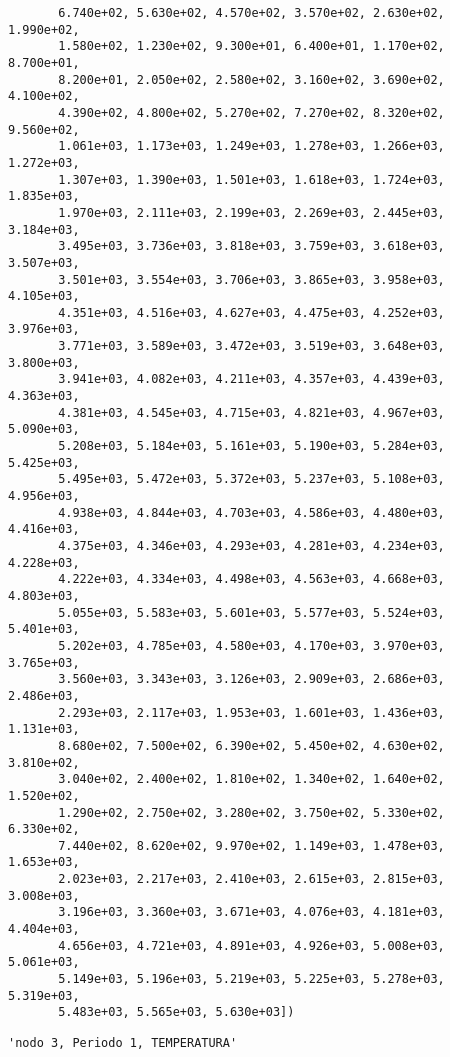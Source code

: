 \documentclass[11pt]{article}
\begin{document}
\begin{verbatim}
       6.740e+02, 5.630e+02, 4.570e+02, 3.570e+02, 2.630e+02, 1.990e+02,
       1.580e+02, 1.230e+02, 9.300e+01, 6.400e+01, 1.170e+02, 8.700e+01,
       8.200e+01, 2.050e+02, 2.580e+02, 3.160e+02, 3.690e+02, 4.100e+02,
       4.390e+02, 4.800e+02, 5.270e+02, 7.270e+02, 8.320e+02, 9.560e+02,
       1.061e+03, 1.173e+03, 1.249e+03, 1.278e+03, 1.266e+03, 1.272e+03,
       1.307e+03, 1.390e+03, 1.501e+03, 1.618e+03, 1.724e+03, 1.835e+03,
       1.970e+03, 2.111e+03, 2.199e+03, 2.269e+03, 2.445e+03, 3.184e+03,
       3.495e+03, 3.736e+03, 3.818e+03, 3.759e+03, 3.618e+03, 3.507e+03,
       3.501e+03, 3.554e+03, 3.706e+03, 3.865e+03, 3.958e+03, 4.105e+03,
       4.351e+03, 4.516e+03, 4.627e+03, 4.475e+03, 4.252e+03, 3.976e+03,
       3.771e+03, 3.589e+03, 3.472e+03, 3.519e+03, 3.648e+03, 3.800e+03,
       3.941e+03, 4.082e+03, 4.211e+03, 4.357e+03, 4.439e+03, 4.363e+03,
       4.381e+03, 4.545e+03, 4.715e+03, 4.821e+03, 4.967e+03, 5.090e+03,
       5.208e+03, 5.184e+03, 5.161e+03, 5.190e+03, 5.284e+03, 5.425e+03,
       5.495e+03, 5.472e+03, 5.372e+03, 5.237e+03, 5.108e+03, 4.956e+03,
       4.938e+03, 4.844e+03, 4.703e+03, 4.586e+03, 4.480e+03, 4.416e+03,
       4.375e+03, 4.346e+03, 4.293e+03, 4.281e+03, 4.234e+03, 4.228e+03,
       4.222e+03, 4.334e+03, 4.498e+03, 4.563e+03, 4.668e+03, 4.803e+03,
       5.055e+03, 5.583e+03, 5.601e+03, 5.577e+03, 5.524e+03, 5.401e+03,
       5.202e+03, 4.785e+03, 4.580e+03, 4.170e+03, 3.970e+03, 3.765e+03,
       3.560e+03, 3.343e+03, 3.126e+03, 2.909e+03, 2.686e+03, 2.486e+03,
       2.293e+03, 2.117e+03, 1.953e+03, 1.601e+03, 1.436e+03, 1.131e+03,
       8.680e+02, 7.500e+02, 6.390e+02, 5.450e+02, 4.630e+02, 3.810e+02,
       3.040e+02, 2.400e+02, 1.810e+02, 1.340e+02, 1.640e+02, 1.520e+02,
       1.290e+02, 2.750e+02, 3.280e+02, 3.750e+02, 5.330e+02, 6.330e+02,
       7.440e+02, 8.620e+02, 9.970e+02, 1.149e+03, 1.478e+03, 1.653e+03,
       2.023e+03, 2.217e+03, 2.410e+03, 2.615e+03, 2.815e+03, 3.008e+03,
       3.196e+03, 3.360e+03, 3.671e+03, 4.076e+03, 4.181e+03, 4.404e+03,
       4.656e+03, 4.721e+03, 4.891e+03, 4.926e+03, 5.008e+03, 5.061e+03,
       5.149e+03, 5.196e+03, 5.219e+03, 5.225e+03, 5.278e+03, 5.319e+03,
       5.483e+03, 5.565e+03, 5.630e+03])
    \end{verbatim}

    
    
    \begin{verbatim}
'nodo 3, Periodo 1, TEMPERATURA'
    \end{verbatim}

    
    
\end{document}
